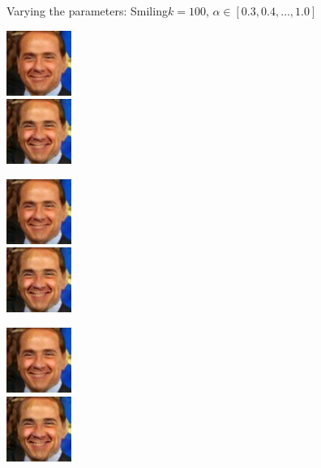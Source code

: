 \documentclass[11pt]{beamer}
\begin{document}
\begin{frame}{Varying the parameters: Smiling}{$k=100$, $\alpha \in [0.3, 0.4, \dots, 1.0]$}
	\centering
	\begin{minipage}{81px}
		\includegraphics[width=80px]{../pictures/outputs/alpha_k/Smiling/k100/Silvio_Berlusconi_0023_alpha-0.3_k-1002017-02-07_13-52-13.png}\\
		\includegraphics[width=80px]{../pictures/outputs/alpha_k/Smiling/k100/Silvio_Berlusconi_0023_alpha-0.7_k-1002017-02-07_15-58-35.png}
	\end{minipage}%
	\begin{minipage}{81px}
		\includegraphics[width=80px]{../pictures/outputs/alpha_k/Smiling/k100/Silvio_Berlusconi_0023_alpha-0.4_k-1002017-02-07_14-15-38.png}\\
		\includegraphics[width=80px]{../pictures/outputs/alpha_k/Smiling/k100/Silvio_Berlusconi_0023_alpha-0.8_k-1002017-02-07_16-29-08.png}
	\end{minipage}%
	\begin{minipage}{81px}
		\includegraphics[width=80px]{../pictures/outputs/alpha_k/Smiling/k100/Silvio_Berlusconi_0023_alpha-0.5_k-1002017-02-07_14-41-42.png}\\
		\includegraphics[width=80px]{../pictures/outputs/alpha_k/Smiling/k100/Silvio_Berlusconi_0023_alpha-0.9_k-1002017-02-07_16-54-53.png}

\end{minipage}
\end{frame}
\end{document}
